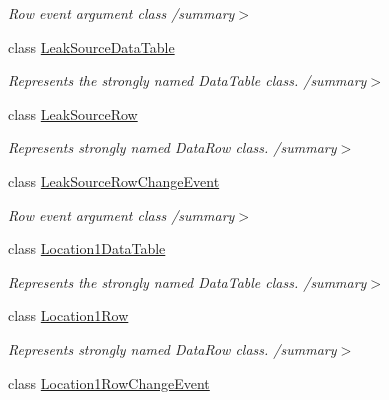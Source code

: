 \begin{DoxyCompactItemize}
\begin{DoxyCompactList}\small\item\em Row event argument class /summary$>$ \end{DoxyCompactList}\item 
class \hyperlink{class_env_int_1_1_win32_1_1_field_tech_1_1_manager_1_1_data_sets_1_1_guide_ware_mobile_data_set_1_1_leak_source_data_table}{Leak\+Source\+Data\+Table}
\begin{DoxyCompactList}\small\item\em Represents the strongly named Data\+Table class. /summary$>$ \end{DoxyCompactList}\item 
class \hyperlink{class_env_int_1_1_win32_1_1_field_tech_1_1_manager_1_1_data_sets_1_1_guide_ware_mobile_data_set_1_1_leak_source_row}{Leak\+Source\+Row}
\begin{DoxyCompactList}\small\item\em Represents strongly named Data\+Row class. /summary$>$ \end{DoxyCompactList}\item 
class \hyperlink{class_env_int_1_1_win32_1_1_field_tech_1_1_manager_1_1_data_sets_1_1_guide_ware_mobile_data_set_86c0d6f3fd40b47433420931434d32a7}{Leak\+Source\+Row\+Change\+Event}
\begin{DoxyCompactList}\small\item\em Row event argument class /summary$>$ \end{DoxyCompactList}\item 
class \hyperlink{class_env_int_1_1_win32_1_1_field_tech_1_1_manager_1_1_data_sets_1_1_guide_ware_mobile_data_set_1_1_location1_data_table}{Location1\+Data\+Table}
\begin{DoxyCompactList}\small\item\em Represents the strongly named Data\+Table class. /summary$>$ \end{DoxyCompactList}\item 
class \hyperlink{class_env_int_1_1_win32_1_1_field_tech_1_1_manager_1_1_data_sets_1_1_guide_ware_mobile_data_set_1_1_location1_row}{Location1\+Row}
\begin{DoxyCompactList}\small\item\em Represents strongly named Data\+Row class. /summary$>$ \end{DoxyCompactList}\item 
class \hyperlink{class_env_int_1_1_win32_1_1_field_tech_1_1_manager_1_1_data_sets_1_1_guide_ware_mobile_data_set_1_1_location1_row_change_event}{Location1\+Row\+Change\+Event}

\end{DoxyCompactItemize}
